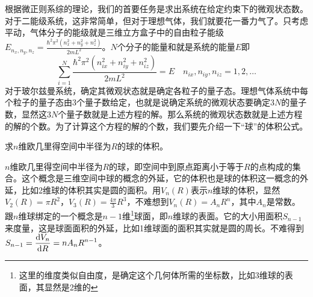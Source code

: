 \documentclass[../../main.tex]{subfiles}
\begin{document}
根据微正则系综的理论，我们的首要任务是求出系统在给定约束下的微观状态数。对于二能级系统，这非常简单，但对于理想气体，我们就要花一番力气了。只考虑平动，气体分子的能级就是三维立方盒子中的自由粒子能级\(E_{n_x,n_y,n_z}=\frac{\hbar^2\pi^2(n_x^2+n_y^2+n_z^2)}{2mL^2}\)。\(N\)个分子的能量和就是系统的能量\(E\)即
\begin{equation}
    \sum_{i=1}^{N} \frac{\hbar^2\pi^2(n_{ix}^2+n_{iy}^2+n_{iz}^2)}{2mL^2}=E \quad n_{ix},n_{iy},n_{iz}=1,2,\dots
\end{equation}
对于玻尔兹曼系统，确定其微观状态就是确定各粒子的量子态。理想气体系统中每个粒子的量子态由3个量子数给定，也就是说确定系统的微观状态要确定\(3N\)的量子数，显然这\(3N\)个量子数就是上述方程的解。那么系统的微观状态数就是上述方程的解的个数。为了计算这个方程的解的个数，我们要先介绍一下“球”的体积公式。
\begin{example}
    求\(n\)维欧几里得空间中半径为\(R\)的球的体积。
    \begin{solution}
        \(n\)维欧几里得空间中半径为\(R\)的球，即空间中到原点距离小于等于\(R\)的点构成的集合。这个概念是三维空间中球的概念的外延，它的体积也是球的体积这一概念的外延，比如2维球的体积其实是圆的面积。用\(V_n(R)\)表示\(n\)维球的体积，显然\(V_2(R)=\pi R^2\)，\(V_3(R)=\frac{4\pi}{3}R^3\)，不难想到\(V_n(R)=A_nR^n\)，其中\(A_n\)是常数。跟\(n\)维球绑定的一个概念是\(n-1\)维\footnote{这里的维度类似自由度，是确定这个几何体所需的坐标数，比如3维球的表面，其显然是2维的}球面，即\(n\)维球的表面。它的大小用面积\(S_{n-1}\)来度量，这是球面面积的外延，比如1维球面的面积其实就是圆的周长。不难得到\(\displaystyle S_{n-1}=\dv{V_n}{R}=nA_nR^{n-1}\)。


\end{solution}
\end{example}
\end{document}
